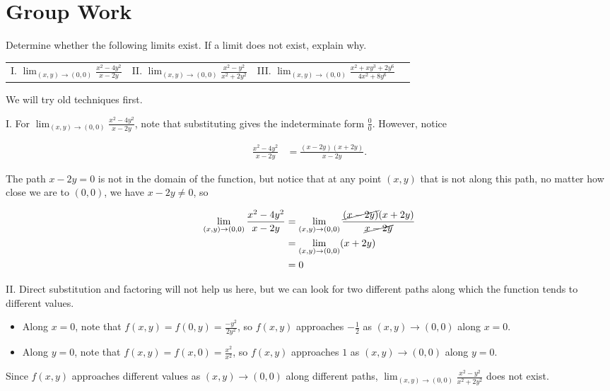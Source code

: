 \documentclass[noauthor, handout]{ximera}
\newcommand{\Lim}[2]{\lim_{#1 \to #2}}
\begin{document}

\section{Group Work}

\begin{problem}
Determine whether the following limits exist.  If a limit does not exist, explain why.

\begin{center}
\begin{tabular}{llll}
I. $\Lim{(x,y)}{(0,0)} \frac{x^2-4y^2}{x-2y}$ \hspace{3mm} &II. $\Lim{(x,y)}{(0,0)} \frac{x^2-y^2}{x^2+2y^2}$ \hspace{3 mm} &III. $\Lim{(x,y)}{(0,0)} \frac{x^2+xy^3+2y^6}{4x^2+8y^6}$
\end{tabular}
\end{center}

\begin{freeResponse}
We will try old techniques first.

I. For $\Lim{(x,y)}{(0,0)} \frac{x^2-4y^2}{x-2y}$, note that substituting gives the indeterminate form $\frac{0}{0}$.  However, notice

\begin{align*}
\frac{x^2-4y^2}{x-2y} & = \frac{(x-2y)(x+2y)}{x-2y} .
\end{align*}

The path $x-2y = 0$ is not in the domain of the function, but notice that at any point $(x,y)$ that is not along this path, no matter how close we are to $(0,0)$, we have $x-2y \neq 0$, so

\begin{align*}
\Lim{(x,y)}{(0,0)} \frac{x^2-4y^2}{x-2y} & = \Lim{(x,y)}{(0,0)} \frac{\cancel{(x-2y)}(x+2y)}{\cancel{x-2y}}\\
&=   \Lim{(x,y)}{(0,0)} (x+2y) \\
&= 0
\end{align*}

II. Direct substitution and factoring will not help us here, but we can look for two different paths along which the function tends to different values. 

\begin{itemize}
\item Along $x=0$, note that $f(x,y) = f(0,y) = \frac{-y^2}{2y^2} $, so $f(x,y)$ approaches $-\frac{1}{2}$ as $(x,y) \to (0,0)$ along $x=0$.
\item Along $y=0$, note that $f(x,y) = f(x,0) = \frac{x^2}{x^2} $, so $f(x,y)$ approaches $1$ as $(x,y) \to (0,0)$ along $y=0$.
\end{itemize}
Since $f(x,y)$ approaches different values as $(x,y) \to (0,0)$ along different paths,  $\Lim{(x,y)}{(0,0)} \frac{x^2-y^2}{x^2+2y^2}$ does not exist.


\end{freeResponse}
\end{problem}
\end{document}
